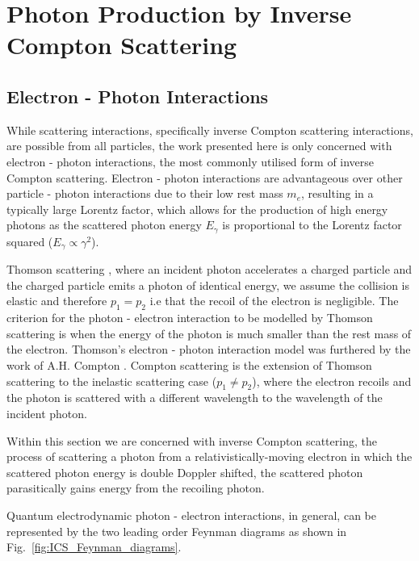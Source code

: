 \documentclass[../main.tex]{subfiles}
\begin{document}
\chapter{Photon Production by Inverse Compton Scattering}
\label{Photon_Production_by_Inverse_Compton_Scattering} %

\section{Electron - Photon Interactions}
\label{sec:electron_photon_interactions}

While scattering interactions, specifically inverse Compton scattering interactions, are possible from all particles, the work presented here is only concerned with electron - photon interactions, the most commonly utilised form of inverse Compton scattering.  Electron - photon interactions are advantageous over other particle - photon interactions due to their low rest mass $m_{e}$, resulting in a typically large Lorentz factor, which allows for the production of high energy photons as the scattered photon energy $E_{\gamma}$ is proportional to the Lorentz factor squared ($E_{\gamma}\propto\gamma^{2}$).    

Thomson scattering \cite{thomson1904xxxiv}, where an incident photon accelerates a charged particle and the charged particle emits a photon of identical energy, we assume the collision is elastic and therefore $p_{1} = p_{2}$ i.e that the recoil of the electron is negligible. The criterion for the photon - electron interaction to be modelled by Thomson scattering is when the energy of the photon is much smaller than the rest mass of the electron. Thomson's electron - photon interaction model was furthered by the work of A.H. Compton \cite{compton1923quantum}. Compton scattering is the extension of Thomson scattering to the inelastic scattering case ($p_{1} \neq p_{2}$), where the electron recoils and the photon is scattered with a different wavelength to the wavelength of the incident photon.

Within this section we are concerned with inverse Compton scattering, the process of scattering a photon from a relativistically-moving  electron in which the scattered photon energy is double Doppler shifted, the scattered photon parasitically gains energy from the recoiling photon.  

Quantum electrodynamic photon - electron interactions, in general, can be represented by the two leading order Feynman diagrams as shown in Fig.~\ref{fig:ICS_Feynman_diagrams}. 
\end{document}
